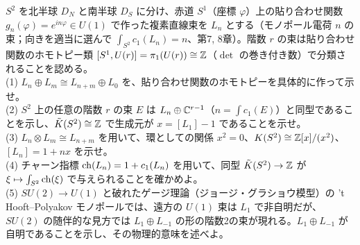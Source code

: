 \begin{problem}[難易度 C]\label{ch11-prob-KS2}
$S^2$ を北半球 $D_N$ と南半球 $D_S$ に分け、赤道 $S^1$（座標 $\varphi$）上の貼り合わせ関数 $g_n(\varphi)=e^{in\varphi}\in U(1)$ で作った複素直線束を $L_n$ とする（モノポール電荷 $n$ の束；向きを適当に選んで $\int_{S^2}c_1(L_n)=n$、第7, 8章）。階数 $r$ の束は貼り合わせ関数のホモトピー類 $[S^1,U(r)]=\pi_1(U(r))\cong\mathbb{Z}$（$\det$ の巻き付き数）で分類されることを認める。\\
(1) $L_n\oplus L_m\cong L_{n+m}\oplus L_0$ を、貼り合わせ関数のホモトピーを具体的に作って示せ。\\
(2) $S^2$ 上の任意の階数 $r$ の束 $E$ は $L_n\oplus\mathbb{C}^{r-1}$（$n=\int c_1(E)$）と同型であることを示し、$\tilde K(S^2)\cong\mathbb{Z}$ で生成元が $x=[L_1]-1$ であることを示せ。\\
(3) $L_n\otimes L_m\cong L_{n+m}$ を用いて、環としての関係 $x^2=0$、$K(S^2)\cong\mathbb{Z}[x]/(x^2)$、$[L_n]=1+nx$ を示せ。\\
(4) チャーン指標 $\operatorname{ch}(L_n)=1+c_1(L_n)$ を用いて、同型 $\tilde K(S^2)\to\mathbb{Z}$ が $\xi\mapsto\int_{S^2}\operatorname{ch}(\xi)$ で与えられることを確かめよ。\\
(5) $SU(2)\to U(1)$ と破れたゲージ理論（ジョージ・グラショウ模型）の 't Hooft--Polyakov モノポールでは、遠方の $U(1)$ 束は $L_1$ で非自明だが、$SU(2)$ の随伴的な見方では $L_1\oplus L_{-1}$ の形の階数2の束が現れる。$L_1\oplus L_{-1}$ が自明であることを示し、その物理的意味を述べよ。
\end{problem}

